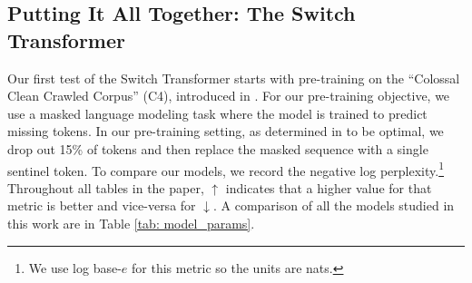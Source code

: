 \documentclass[twoside,11pt]{article}
\begin{document}
\subsection{Putting It All Together: The Switch Transformer}
Our first test of the Switch Transformer starts with pre-training on the ``Colossal Clean Crawled Corpus'' (C4), introduced in \citep{raffel2019exploring}.
For our pre-training objective, we use a masked language modeling task \citep{taylor1953cloze, fedus2018maskgan, devlin2018bert} where the model is trained to predict missing tokens.
In our pre-training setting, as determined in \citet{raffel2019exploring} to be optimal, we drop out 15\% of tokens and then replace the masked sequence with a single sentinel token.
To compare our models, we record the negative log perplexity.\footnote{We use log base-$e$ for this metric so the units are nats.}
Throughout all tables in the paper, $\uparrow$ indicates that a higher value for that metric is better and vice-versa for $\downarrow$. 
A comparison of all the models studied in this work are in Table \ref{tab: model_params}.
\end{document}
